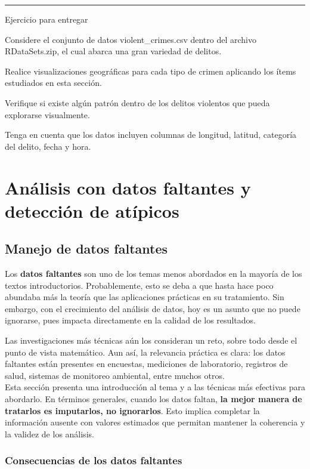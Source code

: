 \documentclass[
]{book}
\begin{document}
\begin{center}\rule{0.5\linewidth}{0.5pt}\end{center}

{} Ejercicio para entregar

Considere el conjunto de datos violent\_crimes.csv dentro del archivo RDataSets.zip, el cual abarca una gran variedad de delitos.

Realice visualizaciones geográficas para cada tipo de crimen aplicando los ítems estudiados en esta sección.

Verifique si existe algún patrón dentro de los delitos violentos que pueda explorarse visualmente.

Tenga en cuenta que los datos incluyen columnas de longitud, latitud, categoría del delito, fecha y hora.

\chapter{Análisis con datos faltantes y detección de atípicos}\label{datafaltante}

\section{Manejo de datos faltantes}\label{manejo-de-datos-faltantes}

Los \textbf{datos faltantes} son uno de los temas menos abordados en la mayoría de los textos introductorios. Probablemente, esto se deba a que hasta hace poco abundaba más la teoría que las aplicaciones prácticas en su tratamiento. Sin embargo, con el crecimiento del análisis de datos, hoy es un asunto que no puede ignorarse, pues impacta directamente en la calidad de los resultados.

Las investigaciones más técnicas aún los consideran un reto, sobre todo desde el punto de vista matemático. Aun así, la relevancia práctica es clara: los datos faltantes están presentes en encuestas, mediciones de laboratorio, registros de salud, sistemas de monitoreo ambiental, entre muchos otros.\\
Esta sección presenta una introducción al tema y a las técnicas más efectivas para abordarlo. En términos generales, cuando los datos faltan, \textbf{la mejor manera de tratarlos es imputarlos, no ignorarlos}. Esto implica completar la información ausente con valores estimados que permitan mantener la coherencia y la validez de los análisis.

\subsection{Consecuencias de los datos faltantes}\label{consecuencias-de-los-datos-faltantes}
\end{document}
